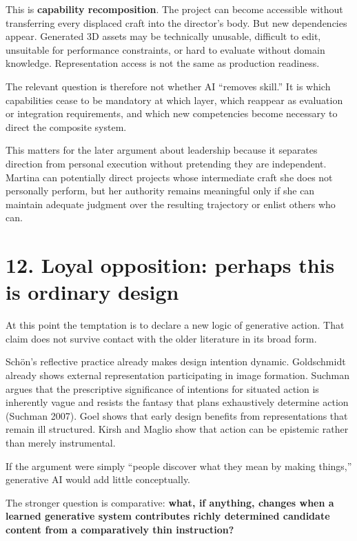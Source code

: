 \documentclass[
  11pt,
  letterpaper,
]{article}
\begin{document}
This is \textbf{capability recomposition}. The project can become
accessible without transferring every displaced craft into the
director's body. But new dependencies appear. Generated 3D assets may be
technically unusable, difficult to edit, unsuitable for performance
constraints, or hard to evaluate without domain knowledge.
Representation access is not the same as production readiness.

The relevant question is therefore not whether AI ``removes skill.'' It
is which capabilities cease to be mandatory at which layer, which
reappear as evaluation or integration requirements, and which new
competencies become necessary to direct the composite system.

This matters for the later argument about leadership because it
separates direction from personal execution without pretending they are
independent. Martina can potentially direct projects whose intermediate
craft she does not personally perform, but her authority remains
meaningful only if she can maintain adequate judgment over the resulting
trajectory or enlist others who can.

\section{12. Loyal opposition: perhaps this is ordinary
design}\label{loyal-opposition-perhaps-this-is-ordinary-design}

At this point the temptation is to declare a new logic of generative
action. That claim does not survive contact with the older literature in
its broad form.

Schön's reflective practice already makes design intention dynamic.
Goldschmidt already shows external representation participating in image
formation. Suchman argues that the prescriptive significance of
intentions for situated action is inherently vague and resists the
fantasy that plans exhaustively determine action (Suchman 2007). Goel
shows that early design benefits from representations that remain ill
structured. Kirsh and Maglio show that action can be epistemic rather
than merely instrumental.

If the argument were simply ``people discover what they mean by making
things,'' generative AI would add little conceptually.

The stronger question is comparative: \textbf{what, if anything, changes
when a learned generative system contributes richly determined candidate
content from a comparatively thin instruction?}
\end{document}
